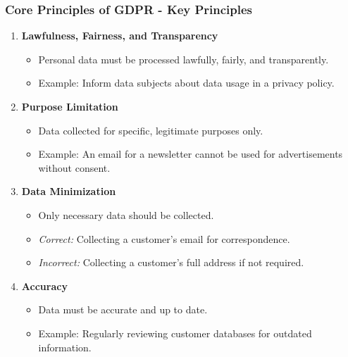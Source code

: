 \documentclass[aspectratio=169]{beamer}
\begin{document}
\begin{frame}[fragile]
    \frametitle{Core Principles of GDPR - Key Principles}
    \begin{enumerate}
        \item \textbf{Lawfulness, Fairness, and Transparency}
            \begin{itemize}
                \item Personal data must be processed lawfully, fairly, and transparently.
                \item Example: Inform data subjects about data usage in a privacy policy.
            \end{itemize}

        \item \textbf{Purpose Limitation}
            \begin{itemize}
                \item Data collected for specific, legitimate purposes only.
                \item Example: An email for a newsletter cannot be used for advertisements without consent.
            \end{itemize}

        \item \textbf{Data Minimization}
            \begin{itemize}
                \item Only necessary data should be collected.
                \item \textit{Correct:} Collecting a customer's email for correspondence.
                \item \textit{Incorrect:} Collecting a customer's full address if not required.
            \end{itemize}

        \item \textbf{Accuracy}
            \begin{itemize}
                \item Data must be accurate and up to date.
                \item Example: Regularly reviewing customer databases for outdated information.
            \end{itemize}
    \end{enumerate}
\end{frame}
\end{document}
